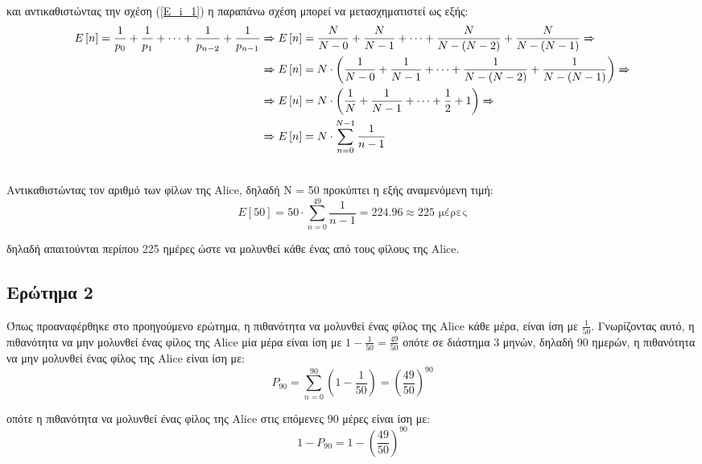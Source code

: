 και αντικαθιστώντας την σχέση (\ref{E_i_1}) η παραπάνω σχέση μπορεί να μετασχηματιστεί ως εξής:
\begin{align}
	E\left[n\right] = \frac{1}{p_{0}}  + \frac{1}{p_{1}} + \cdots  + \frac{1}{p_{n-2}} + \frac{1}{p_{n-1}}& \xRightarrow{} E\left[n\right] = \frac{N}{N - 0}  + \frac{N}{N - 1} + \cdots  + \frac{N}{N - (N-2)} + \frac{N}{N - (N-1)} \xRightarrow{}  \notag \\
																										  & \xRightarrow{} E\left[n\right] =  N \cdot \left(\frac{1}{N - 0}  + \frac{1}{N - 1} + \cdots  + \frac{1}{N - (N-2)} + \frac{1}{N - (N-1)} \right) \xRightarrow{}  \notag \\
																										  & \xRightarrow{} E\left[n\right] = N \cdot \left(\frac{1}{N}  + \frac{1}{N - 1} + \cdots  + \frac{1}{2} + 1 \right) \xRightarrow{}  \notag \\
																										  & \xRightarrow{} E\left[n\right] = N \cdot \sum_{n = 0}^{N - 1} \frac{1}{n - 1}
\end{align}

\noindent\\
Αντικαθιστώντας τον αριθμό των φίλων της Alice, δηλαδή Ν = 50 προκύπτει η εξής αναμενόμενη τιμή:
\begin{equation*}
	E\left[50\right] = 50 \cdot \sum_{n = 0}^{49}  \frac{1}{n - 1} = 224.96 \approx 225 \text{ μέρες}
\end{equation*}

δηλαδή απαιτούνται περίπου 225 ημέρες ώστε να μολυνθεί κάθε ένας από τους φίλους της Alice.

\clearpage
\subsection*{Ερώτημα 2}
\label{ex1q2}

Όπως προαναφέρθηκε στο προηγούμενο ερώτημα, η πιθανότητα να μολυνθεί ένας φίλος της Alice κάθε μέρα, είναι ίση με $\frac{1}{50}$. Γνωρίζοντας αυτό, η πιθανότητα να μην μολυνθεί ένας φίλος της Alice μία μέρα είναι ίση με $1 - \frac{1}{50} = \frac{49}{50}$ οπότε σε διάστημα 3 μηνών, δηλαδή 90 ημερών, η πιθανότητα να μην μολυνθεί ένας φίλος της Alice είναι ίση με: 
\begin{equation}
	P_{90} = \sum_{n=0}^{90} \left(1 - \frac{1}{50}\right) = \left(\frac{49}{50} \right)^{90} \label{p_90}
\end{equation}

οπότε η πιθανότητα να μολυνθεί ένας φίλος της Alice στις επόμενες 90 μέρες είναι ίση με:
\begin{equation}
	1 - P_{90} = 1 - \left(\frac{49}{50} \right)^{90} \label{P_90_bar}
\end{equation}

